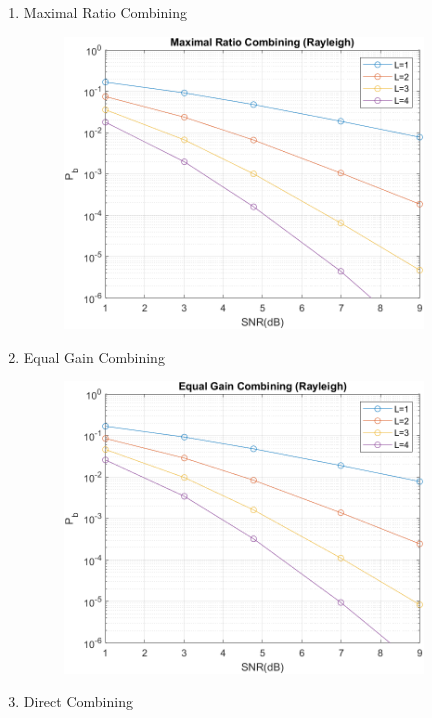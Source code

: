 \documentclass{article}
\begin{document}
\begin{flushleft}
\begin{enumerate}
\begin{enumerate}
\begin{figure}[H]
			\end{figure}
\newpage
		\item Maximal Ratio Combining\\
			\begin{figure}[H]
			\centering
			\includegraphics[width=0.9\textwidth, height=0.4\textheight]{Rayleigh_MRC}
			\end{figure}
		\item Equal Gain Combining\\
			\begin{figure}[H]
			\centering
			\includegraphics[width=0.9\textwidth, height=0.4\textheight]{Rayleigh_EGC}
			\end{figure}
\newpage
		\item Direct Combining\\

\end{enumerate}
\end{enumerate}
\end{flushleft}
\end{document}
